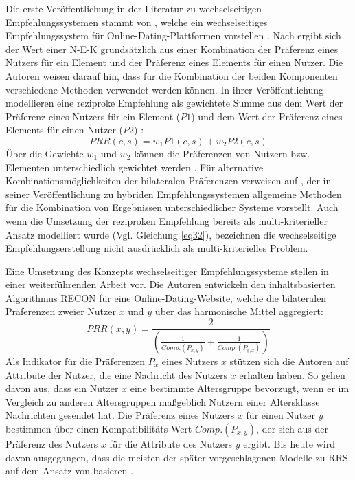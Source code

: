 Die erste Veröffentlichung in der Literatur zu wechselseitigen Empfehlungssystemen stammt von \textcite[S. 1ff.]{pizzato:inproceedings}, welche ein wechselseitiges Empfehlungssystem für Online-Dating-Plattformen vorstellen \cite[S. 1469]{yildirim:article}.
Nach \textcite[S. 5]{pizzato:inproceedings} ergibt sich der Wert einer \ac{N-E-K} grundsätzlich aus einer Kombination der Präferenz eines Nutzers für ein Element und der Präferenz eines Elements für einen Nutzer.
Die Autoren weisen darauf hin, dass für die Kombination der beiden Komponenten verschiedene Methoden verwendet werden können.
In ihrer Veröffentlichung modellieren \textcite[S. 6]{pizzato:inproceedings} eine reziproke Empfehlung als gewichtete Summe aus dem Wert der Präferenz eines Nutzers für ein Element ($P1$) und dem Wert der Präferenz eines Elements für einen Nutzer ($P2$) \cite[S. 6]{pizzato:inproceedings}:
\begin{equation}\label{eq32}
    PRR(c,s) = w_{1}P1(c,s) + w_{2}P2(c,s)
\end{equation}
Über die Gewichte $w_{1}$ und $w_{2}$ können die Präferenzen von Nutzern bzw. Elementen unterschiedlich gewichtet werden \cite[S. 6]{pizzato:inproceedings}.
Für alternative Kombinationsmöglichkeiten der bilateralen Präferenzen verweisen \textcite[S. 5]{pizzato:inproceedings} auf \textcite[S. 339ff.]{burke:article}, der in seiner Veröffentlichung zu hybriden Empfehlungssystemen allgemeine Methoden für die Kombination von Ergebnissen unterschiedlicher Systeme vorstellt.
Auch wenn die Umsetzung der reziproken Empfehlung bereits als multi-kriterieller Ansatz modelliert wurde (Vgl. Gleichung \ref{eq32}), bezeichnen \textcite[S. 1ff.]{pizzato:inproceedings} die wechselseitige Empfehlungserstellung nicht ausdrücklich als multi-kriterielles Problem. 

Eine Umsetzung des Konzepts wechselseitiger Empfehlungssysteme stellen \textcite[S. 207ff.]{pizzato:2010} in einer weiterführenden Arbeit vor.
Die Autoren entwickeln den inhaltsbasierten Algorithmus RECON für eine Online-Dating-Website, welche die bilateralen Präferenzen zweier Nutzer $x$ und $y$ über das harmonische Mittel aggregiert:
\begin{equation}\label{eq33}
    PRR(x,y) = \frac{2}{(\frac{1}{Comp.(P_{x,y})}+\frac{1}{Comp.(P_{y,x})})}
\end{equation}
Als Indikator für die Präferenzen $P_{x}$ eines Nutzers $x$ stützen sich die Autoren auf Attribute der Nutzer, die eine Nachricht des Nutzers $x$ erhalten haben.
So gehen \textcite[S. 210]{pizzato:2010} davon aus, dass ein Nutzer $x$ eine bestimmte Altersgruppe bevorzugt, wenn er im Vergleich zu anderen Altersgruppen maßgeblich Nutzern einer Altersklasse Nachrichten gesendet hat.
Die Präferenz eines Nutzers $x$ für einen Nutzer $y$ bestimmen \textcite[S. 210]{pizzato:2010} über einen Kompatibilitäts-Wert $Comp.(P_{x,y})$, der sich aus der Präferenz des Nutzers $x$ für die Attribute des Nutzers $y$ ergibt.
Bis heute wird davon ausgegangen, dass die meisten der später vorgeschlagenen Modelle zu \ac{RRS} auf dem Ansatz von \textcite[S. 207ff.]{pizzato:2010} basieren \cite[S. 723]{kumari:article}.

